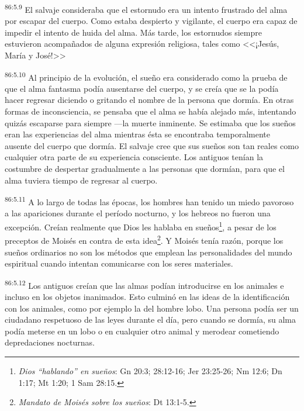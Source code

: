 \par
\textsuperscript{86:5.9} El salvaje consideraba que el estornudo era un intento frustrado del alma por escapar del cuerpo. Como estaba despierto y vigilante, el cuerpo era capaz de impedir el intento de huida del alma. Más tarde, los estornudos siempre estuvieron acompañados de alguna expresión religiosa, tales como <<¡Jesús, María y José!>>

\par
\textsuperscript{86:5.10} Al principio de la evolución, el sueño era considerado como la prueba de que el alma fantasma podía ausentarse del cuerpo, y se creía que se la podía hacer regresar diciendo o gritando el nombre de la persona que dormía. En otras formas de inconsciencia, se pensaba que el alma se había alejado más, intentando quizás escaparse para siempre ---la muerte inminente. Se estimaba que los sueños eran las experiencias del alma mientras ésta se encontraba temporalmente ausente del cuerpo que dormía. El salvaje cree que sus sueños son tan reales como cualquier otra parte de su experiencia consciente. Los antiguos tenían la costumbre de despertar gradualmente a las personas que dormían, para que el alma tuviera tiempo de regresar al cuerpo.

\par
\textsuperscript{86:5.11} A lo largo de todas las épocas, los hombres han tenido un miedo pavoroso a las apariciones durante el período nocturno, y los hebreos no fueron una excepción. Creían realmente que Dios les hablaba en sueños\footnote{\textit{Dios ``hablando'' en sueños}: Gn 20:3; 28:12-16; Jer 23:25-26; Nm 12:6; Dn 1:17; Mt 1:20; 1 Sam 28:15.}, a pesar de los preceptos de Moisés en contra de esta idea\footnote{\textit{Mandato de Moisés sobre los sueños}: Dt 13:1-5.}. Y Moisés tenía razón, porque los sueños ordinarios no son los métodos que emplean las personalidades del mundo espiritual cuando intentan comunicarse con los seres materiales.

\par
\textsuperscript{86:5.12} Los antiguos creían que las almas podían introducirse en los animales e incluso en los objetos inanimados. Esto culminó en las ideas de la identificación con los animales, como por ejemplo la del hombre lobo. Una persona podía ser un ciudadano respetuoso de las leyes durante el día, pero cuando se dormía, su alma podía meterse en un lobo o en cualquier otro animal y merodear cometiendo depredaciones nocturnas.

